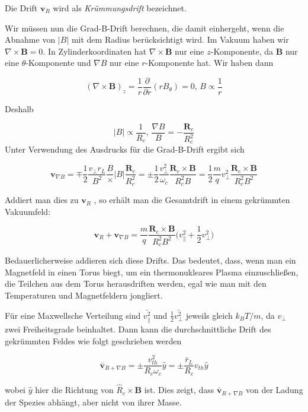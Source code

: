 \documentclass[
  a4paper,
  DIV=11]{scrreprt}
\begin{document}
Die Drift \(\mathbf{v}_R\) wird als \emph{Krümmungsdrift} bezeichnet.

Wir müssen nun die Grad-B-Drift berechnen, die damit einhergeht, wenn
die Abnahme von \(|B|\) mit dem Radius berücksichtigt wird. Im Vakuum
haben wir \(\nabla\times\mathbf{B} = 0\). In Zylinderkoordinaten hat
\(\nabla\times\mathbf{B}\) nur eine \(z\)-Komponente, da \(\mathbf{B}\)
nur eine \(\theta\)-Komponente und \(\nabla B\) nur eine
\(r\)-Komponente hat. Wir haben dann

\[
(\nabla\times\mathbf{B})_z = \frac{1}{r}\frac{\partial}{\partial r}(rB_\theta) = 0,\, B\propto \frac{1}{r}
\]

Deshalb

\[
|B| \propto \frac{1}{R_c},\, \frac{\nabla B}{B} = - \frac{\mathbf{R}_c}{R_c^2}
\] Unter Verwendung des Ausdrucks für die Grad-B-Drift ergibt sich

\[
\mathbf{v}_{\nabla B} = \mp \frac{1}{2}\frac{v_\perp r_L}{B^2}\frac{B}\times |B| \frac{\mathbf{R}_c}{R_c^2} = \pm \frac{1}{2}\frac{v_\perp^2}{\omega_c}\frac{\mathbf{R}_c\times\mathbf{B}}{R_c^2 B} = \frac{1}{2}\frac{m}{q}v_\perp^2\frac{\mathbf{R}_c\times\mathbf{B}}{R_c^2 B^2}
\]

Addiert man dies zu \(\mathbf{v}_R\) , so erhält man die Gesamtdrift in
einem gekrümmten Vakuumfeld:

\[
\mathbf{v}_R + \mathbf{v}_{\nabla B} = \frac{m}{q}\frac{\mathbf{R}_c\times\mathbf{B}}{R_c^2 B^2}\Big( v_\parallel^2 + \frac{1}{2}v_\perp^2 \Big)
\]

Bedauerlicherweise addieren sich diese Drifts. Das bedeutet, dass, wenn
man ein Magnetfeld in einen Torus biegt, um ein thermonukleares Plasma
einzuschließen, die Teilchen aus dem Torus herausdriften werden, egal
wie man mit den Temperaturen und Magnetfeldern jongliert.

Für eine Maxwellsche Verteilung sind \(\bar{v_\parallel^2}\) und
\(\frac{1}{2}\bar{v_\perp^2}\) jeweils gleich \(k_B T/m\), da
\(v_\perp\) zwei Freiheitsgrade beinhaltet. Dann kann die
durchschnittliche Drift des gekrümmten Feldes wie folgt geschrieben
werden

\[
\bar{\mathbf{v}}_{R+\nabla B} = \pm \frac{v_{th}^2}{R_c\omega_c}\widehat{y} = \pm\frac{\bar{r}_L}{R_c}v_{th}\widehat{y}
\]

wobei \(\widehat{y}\) hier die Richtung von
\(\widehat{R}_c\times\mathbf{B}\) ist. Dies zeigt, dass
\(\bar{\mathbf{v}}_{R+\nabla B}\) von der Ladung der Spezies abhängt,
aber nicht von ihrer Masse.
\end{document}
